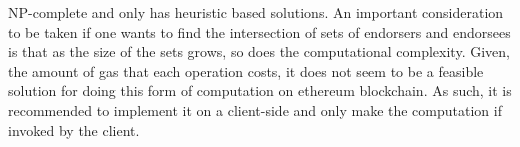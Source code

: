NP-complete and only has heuristic based solutions.  An important consideration
to be taken if one wants to find the intersection of sets of endorsers and
endorsees is that as the size of the sets grows, so does the computational
complexity. Given, the amount of gas that each operation costs, it does not
seem to be a feasible solution for doing this form of computation on ethereum
blockchain. As such, it is recommended to implement it on a client-side and
only make the computation if invoked by the client.


%















